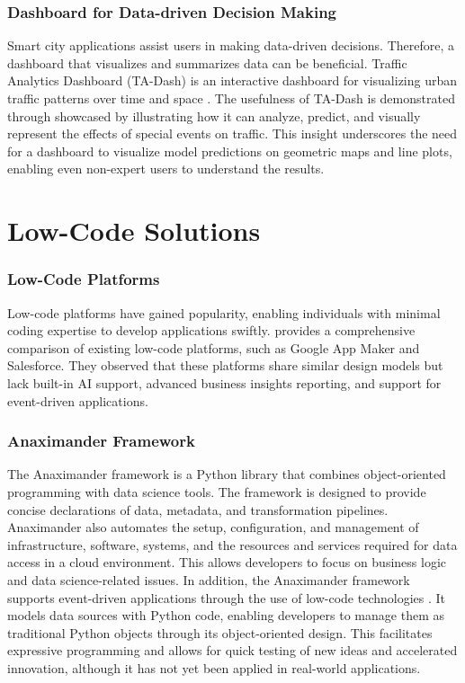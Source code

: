 \subsubsection{Dashboard for Data-driven Decision Making}
Smart city applications assist users in making data-driven decisions. Therefore, a dashboard that visualizes and summarizes data can be beneficial. Traffic Analytics Dashboard (TA-Dash) is an interactive dashboard for visualizing urban traffic patterns over time and space \cite{tempelmeier2020ta}. The usefulness of TA-Dash is demonstrated through showcased by illustrating how it can analyze, predict, and visually represent the effects of special events on traffic. This insight underscores the need for a dashboard to visualize model predictions on geometric maps and line plots, enabling even non-expert users to understand the results.

\section{Low-Code Solutions}
\label{sec:low-code_solutions}
\subsubsection{Low-Code Platforms}
Low-code platforms have gained popularity, enabling individuals with minimal coding expertise to develop applications swiftly. \cite{sahay2020supporting} provides a comprehensive comparison of existing low-code platforms, such as Google App Maker and Salesforce. They observed that these platforms share similar design models but lack built-in AI support, advanced business insights reporting, and support for event-driven applications.

\subsubsection{Anaximander Framework}
The Anaximander framework is a Python library that combines object-oriented programming with data science tools. The framework is designed to provide concise declarations of data, metadata, and transformation pipelines. Anaximander also automates the setup, configuration, and management of infrastructure, software, systems, and the resources and services required for data access in a cloud environment. This allows developers to focus on business logic and data science-related issues. In addition, the Anaximander framework supports event-driven applications through the use of low-code technologies \cite{jd2021anaximander}. It models data sources with Python code, enabling developers to manage them as traditional Python objects through its object-oriented design. This facilitates expressive programming and allows for quick testing of new ideas and accelerated innovation, although it has not yet been applied in real-world applications.
